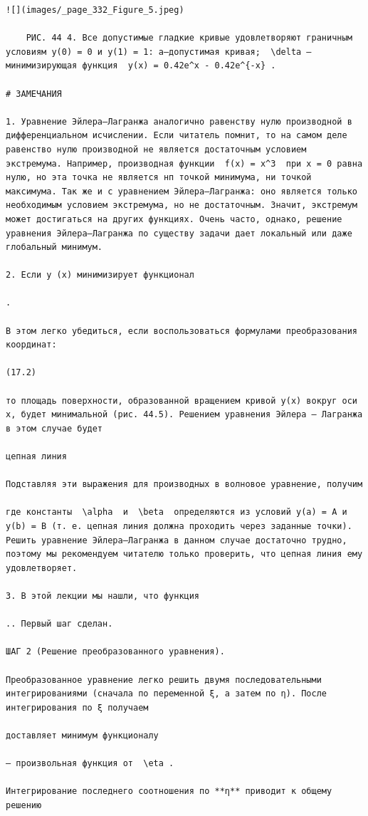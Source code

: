 \documentclass[
  ukrainian,
]{article}
\begin{document}
\begin{verbatim}
![](images/_page_332_Figure_5.jpeg)

    РИС. 44 4. Все допустимые гладкие кривые удовлетворяют граничным условиям y(0) = 0 и y(1) = 1: a—допустимая кривая;  \delta —минимизирующая функция  y(x) = 0.42e^x - 0.42e^{-x} .

# ЗАМЕЧАНИЯ

1. Уравнение Эйлера—Лагранжа аналогично равенству нулю производной в дифференциальном исчислении. Если читатель помнит, то на самом деле равенство нулю производной не является достаточным условием экстремума. Например, производная функции  f(x) = x^3  при x = 0 равна нулю, но эта точка не является нп точкой минимума, ни точкой максимума. Так же и с уравнением Эйлера—Лагранжа: оно является только необходимым условием экстремума, но не достаточным. Значит, экстремум может достигаться на других функциях. Очень часто, однако, решение уравнения Эйлера—Лагранжа по существу задачи дает локальный или даже глобальный минимум.

2. Если у (х) минимизирует функционал

.

В этом легко убедиться, если воспользоваться формулами преобразования координат:

(17.2)

то площадь поверхности, образованной вращением кривой y(x) вокруг оси x, будет минимальной (рис. 44.5). Решением уравнения Эйлера — Лагранжа в этом случае будет

цепная линия

Подставляя эти выражения для производных в волновое уравнение, получим

где константы  \alpha  и  \beta  определяются из условий y(a) = A и y(b) = B (т. е. цепная линия должна проходить через заданные точки). Решить уравнение Эйлера—Лагранжа в данном случае достаточно трудно, поэтому мы рекомендуем читателю только проверить, что цепная линия ему удовлетворяет.

3. В этой лекции мы нашли, что функция

.. Первый шаг сделан.

ШАГ 2 (Решение преобразованного уравнения).

Преобразованное уравнение легко решить двумя последовательными интегрированиями (сначала по переменной ξ, а затем по η). После интегрирования по ξ получаем

доставляет минимум функционалу

— произвольная функция от  \eta .

Интегрирование последнего соотношения по **η** приводит к общему решению


\end{verbatim}
\end{document}
